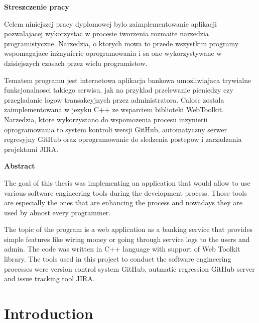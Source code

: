 \documentclass[a4paper,12pt]{book}
\newcommand\tab[1][1cm]{\hspace*{#1}}
\begin{document}
{\newpage
\begin{flushleft}
{\bf\large\textsf{Streszczenie pracy}}\\
\end{flushleft}
{
\tab Celem niniejszej pracy dyplomowej bylo zaimplementowanie aplikacji pozwalajacej wykorzystac w procesie tworzenia rozmaite narzedzia programistyczne. Narzedzia, o ktorych mowa to przede wszystkim programy wspomagajace inżnynierie oprogramowania i sa one wykorzystywane w dzisiejszych czasach przez wielu programistow. 

\bigskip
Tematem programu jest internetowa aplikacja bankowa umozliwiajaca trywialne funkcjonalnosci takiego serwisu, jak na przyklad przelewanie pieniedzy czy przegladanie logow transakcyjnych przez administratora. Calosc zostala zaimplementowana w jezyku C++ ze wsparciem biblioteki WebToolkit. Narzedzia, ktore wykorzystano do wspomozenia procesu inzynierii oprogramowania to system kontroli wersji GitHub, automatyczny serwer regresyjny GitHub oraz oprogramowanie do sledzenia postepow i zarzadzania projektami JIRA.
}

\bigskip
\begin{flushleft}
{\bf\large\textsf{Abstract}}\\
\end{flushleft}
{
\tab The goal of this thesis was implementing an application that would allow to use various  software engineering tools during the development process. Those tools are especially the ones that are enhancing the process and nowadays they are used by almost every programmer.

\bigskip
The topic of the program is a web application as a banking service that provides simple features like wiring money or going through service logs to the users and admin. The code was written in C++ language with support of Web Toolkit library. The tools used in this project to conduct the software engineering processes were version control system GitHub, autmatic regression GitHub server and issue tracking tool JIRA. 
}
	

\tableofcontents
\chapter*{Introduction}
%
\tab {Software engineering is a very wide area of engineering which particularly concerns developing and maintaining programming products. A development process itself is a major challenge to all people involved, starting with engineers creating the code, continuing with product owners who are managing teams and coordinating the work flow and ending-up with managers who are setting the direction of the whole process.

}}
\end{document}
